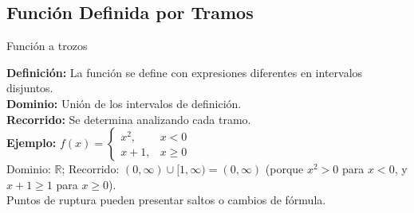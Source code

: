 \documentclass[12pt,a4paper]{article}
\begin{document}
\subsection{Función Definida por Tramos}
\begin{funcbox}{Función a trozos}
\begin{minipage}[t]{0.55\textwidth}
    \textbf{Definición:} La función se define con expresiones diferentes en intervalos disjuntos.\\
    \textbf{Dominio:} Unión de los intervalos de definición.\\
    \textbf{Recorrido:} Se determina analizando cada tramo.\\
    \textbf{Ejemplo:} 
    $f(x)=\begin{cases}
        x^2, & x<0 \\
        x+1, & x\geq 0
    \end{cases}$\\
    Dominio: $\mathbb{R}$; Recorrido: $(0,\infty)\cup[1,\infty) = (0,\infty)$ (porque $x^2>0$ para $x<0$, y $x+1\geq1$ para $x\geq0$).\\
    Puntos de ruptura pueden presentar saltos o cambios de fórmula.
\end{minipage}\hfill
\begin{minipage}[t]{0.4\textwidth}
    \centering
\end{minipage}
\end{funcbox}

\end{document}

